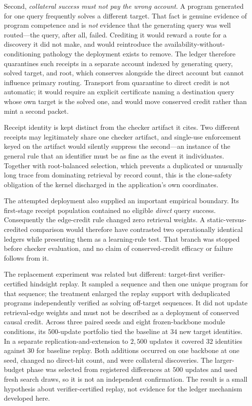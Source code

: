 \documentclass[11pt]{article}
\begin{document}
Second, \emph{collateral success must not pay the wrong account}.  A program generated for
one query frequently solves a different target.  That fact is genuine evidence of program
competence and is \emph{not} evidence that the generating query was well routed---the
query, after all, failed.  Crediting it would reward a route for a discovery it did not
make, and would reintroduce the availability-without-conditioning pathology the deployment
exists to remove.  The ledger therefore quarantines such receipts in a separate account
indexed by generating query, solved target, and root, which conserves alongside the direct
account but cannot influence primary routing.  Transport from quarantine to direct credit
is not automatic; it would require an explicit certificate naming a destination query whose
own target is the solved one, and would move conserved credit rather than mint a second
packet.

Receipt identity is kept distinct from the checker artifact it cites.  Two different
receipts may legitimately share one checker artifact, and single-use enforcement keyed on
the artifact would silently suppress the second---an instance of the general rule that an
identifier must be as fine as the event it individuates.  Together with root-balanced
selection, which prevents a duplicated or unusually long trace from dominating retrieval by
record count, this is the clone-safety obligation of the kernel discharged in the
application's own coordinates.

The attempted deployment also supplied an important empirical boundary.  Its first-stage
receipt population contained no eligible \emph{direct} query success.  Consequently the
edge-credit rule changed zero retrieval weights.  A static-versus-credited comparison
would therefore have contrasted two operationally identical ledgers while presenting
them as a learning-rule test.  That branch was stopped before checker evaluation, and no
claim of conserved-credit efficacy or failure follows from it.

The replacement experiment was related but different: target-first verifier-certified
hindsight replay.  It sampled a sequence and then one unique program for that sequence;
the treatment enlarged the replay support with deduplicated programs independently
verified as solving off-target sequences.  It did not update retrieval-edge weights and
must not be described as a deployment of conserved causal credit.  Across three paired
seeds and eight frozen-backbone module conditions, its $500$-update portfolio tied the
baseline at $34$ new target identities.  In a separate replication-and-extension to
$2{,}500$ updates it covered $32$ identities against $30$ for baseline replay.  Both
additions occurred on one backbone at one seed, changed no direct-hit count, and were
collateral discoveries.  The larger-budget phase was selected from registered differences
at $500$ updates and used fresh search draws, so it is not an independent confirmation.
The result is a small hypothesis about verifier-certified
replay, not evidence for the ledger mechanism developed here.
\end{document}
